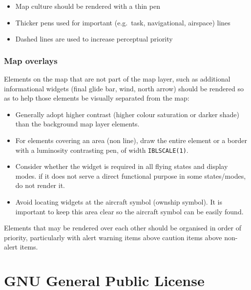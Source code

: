 \documentclass[a4paper,12pt]{refrep}
\begin{document}
\begin{itemize}
\item Map culture should be rendered with a thin pen
\item Thicker pens used for important (e.g.\ task, navigational, airspace) lines
\item Dashed lines are used to increase perceptual priority
\end{itemize}

\subsection{Map overlays}
Elements on the map that are not part of the map layer, such as additional
informational widgets (final glide bar, wind, north arrow) should be rendered
so as to help those elements be visually separated from the map:

\begin{itemize}
\item Generally adopt higher contrast (higher colour saturation or darker shade) than the background map layer elements.

\item For elements covering an area (non line), draw the entire element or a border
with a luminosity contrasting pen, of width \verb|IBLSCALE(1)|.

\item Consider whether the widget is required in all flying states and display modes.
if it does not serve a direct functional purpose in some states/modes, do not
render it.

\item Avoid locating widgets at the aircraft symbol (ownship symbol).
It is important to keep this area clear so the aircraft symbol can be easily found.

\end{itemize}

Elements that may be rendered over each other should be organised in order of
priority, particularly with alert warning items above caution items above non-alert items.

\appendix

\chapter{GNU General Public License}\label{cha:gnu-general-public}

\end{document}
